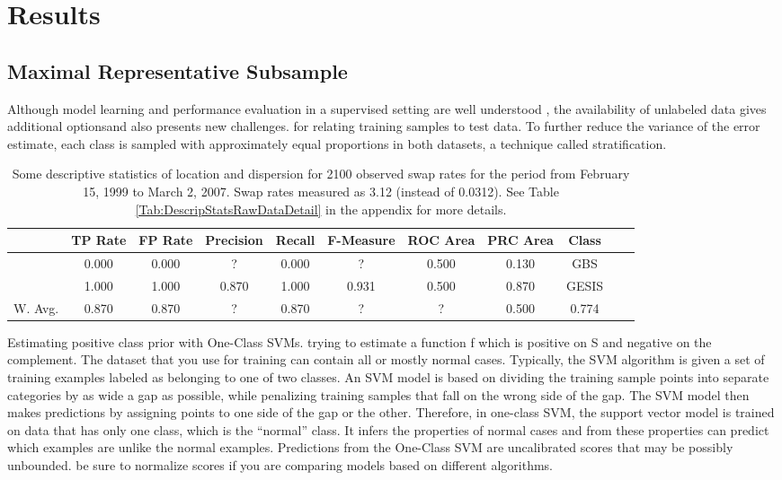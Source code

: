\chapter{Results}\label{Sec:Results}

\section{Maximal Representative Subsample}

Although model learning and performance evaluation in a supervised setting are well understood \cite{hastie}, the availability of unlabeled data gives additional optionsand also presents new challenges.
for relating training samples to test data. To further reduce the variance of the error estimate, each class is sampled with approximately equal proportions in both datasets, a technique called stratiﬁcation. 

\begin{table}[ht]
    \begin{center}
            {\footnotesize
            \begin{tabular}{l|cccccccccc}
                \hline \hline
                           &  TP Rate & FP Rate & Precision & Recall & F-Measure & ROC Area & PRC Area & Class \\
                \hline
                      & 0.000 & 0.000 & ? & 0.000 & ? & 0.500 & 0.130 & GBS &\\
                      & 1.000 & 1.000 & 0.870 & 1.000 & 0.931 & 0.500 & 0.870 & GESIS &\\
                \hline \hline
		 W. Avg. & 0.870 & 0.870 & ? & 0.870 & ? & ? & 0.500 & 0.774 &
            \end{tabular}}
        \caption{Some descriptive statistics of location and dispersion for 2100 observed swap rates for the period from February 15, 1999 to March 2, 2007. Swap rates measured as 3.12 (instead of 0.0312). See Table \ref{Tab:DescripStatsRawDataDetail} in the appendix for more details.}
\label{Tab:DescripStatsRawData}
\end{center}
\end{table}

Estimating positive class prior with One-Class SVMs. trying to estimate a function f which is positive on S and negative on the complement. The dataset that you use for training can contain all or mostly normal cases. Typically, the SVM algorithm is given a set of training examples labeled as belonging to one of two classes. An SVM model is based on dividing the training sample points into separate categories by as wide a gap as possible, while penalizing training samples that fall on the wrong side of the gap. The SVM model then makes predictions by assigning points to one side of the gap or the other. Therefore, in one-class SVM, the support vector model is trained on data that has only one class, which is the “normal” class. It infers the properties of normal cases and from these properties can predict which examples are unlike the normal examples.  Predictions from the One-Class SVM are uncalibrated scores that may be possibly unbounded. be sure to normalize scores if you are comparing models based on different algorithms.

